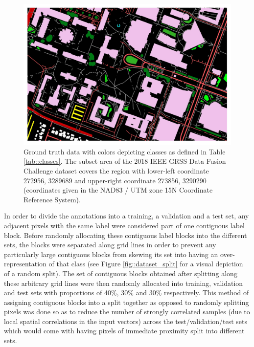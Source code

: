 \documentclass[
twocolumn,
]{ceurart}
\begin{document}

\begin{figure}[!t]
\centering
\includegraphics[width=\columnwidth]{figures/gt.jpg}
\caption{Ground truth data with colors depicting classes as defined in Table \ref{tab::classes}. The subset area of the 2018 IEEE GRSS Data Fusion Challenge dataset covers the region with lower-left coordinate 272956, 3289689 and upper-right coordinate 273856, 3290290 (coordinates given in the NAD83 / UTM zone 15N Coordinate Reference System).}
\label{fig::gt}
\end{figure}

In order to divide the annotations into a training, a validation and a test set, any adjacent pixels with the same label were considered part of one contiguous label block.
Before randomly allocating these contiguous label blocks into the different sets, the blocks were separated along grid lines in order to prevent any particularly large contiguous blocks from skewing its set into having an over-representation of that class (see Figure \ref{fig::dataset_split} for a visual depiction of a random split).
The set of contiguous blocks obtained after splitting along these arbitrary grid lines were then randomly allocated into training, validation and test sets with proportions of 40\%, 30\% and 30\% respectively.
This method of assigning contiguous blocks into a split together as opposed to randomly splitting pixels was done so as to reduce the number of strongly correlated samples (due to local spatial correlations in the input vectors) across the test/validation/test sets which would come with having pixels of immediate proximity split into different sets.
\end{document}

